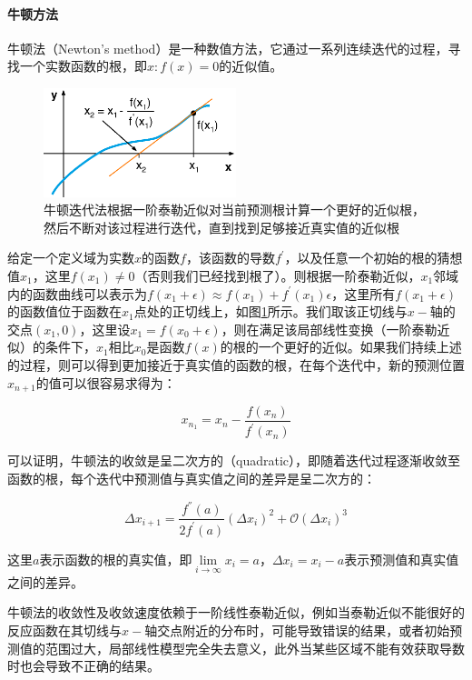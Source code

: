 \paragraph{牛顿方法}
牛顿法（Newton's method）是一种数值方法，它通过一系列连续迭代的过程，寻找一个实数函数的根，即$x:f(x)=0$的近似值。

\begin{figure}
	\sidecaption
	\includegraphics[width=0.5\textwidth]{figures/mlt/Newton-method}
	\caption{牛顿迭代法根据一阶泰勒近似对当前预测根计算一个更好的近似根，然后不断对该过程进行迭代，直到找到足够接近真实值的近似根}
	\label{f:mlt-Newton-method}
\end{figure}

给定一个定义域为实数$x$的函数$f$，该函数的导数$f^{'}$，以及任意一个初始的根的猜想值$x_1$，这里$f(x_1)\neq 0$（否则我们已经找到根了）。则根据一阶泰勒近似，$x_1$邻域内的函数曲线可以表示为$f(x_1+\epsilon)\approx f(x_1)+f^{'}(x_1)\epsilon$，这里所有$f(x_1+\epsilon)$的函数值位于函数在$x_1$点处的正切线上，如图\ref{f:mlt-Newton-method}所示。我们取该正切线与$x-$轴的交点$(x_1,0)$，这里设$x_1=f(x_0+\epsilon)$，则在满足该局部线性变换（一阶泰勒近似）的条件下，$x_1$相比$x_0$是函数$f(x)$的根的一个更好的近似。如果我们持续上述的过程，则可以得到更加接近于真实值的函数的根，在每个迭代中，新的预测位置$x_{n+1}$的值可以很容易求得为：

\begin{equation}
	x_{n_1}=x_n-\frac{f(x_n)}{f^{'}(x_n)}
\end{equation}

可以证明，牛顿法的收敛是呈二次方的（quadratic），即随着迭代过程逐渐收敛至函数的根，每个迭代中预测值与真实值之间的差异是呈二次方的：

\begin{equation}
	\Delta x_{i+1}=\frac{f^{''}(a)}{2f^{'}(a)}(\Delta x_i)^{2}+\mathcal{O}(\Delta x_i)^{3}
\end{equation}

\noindent 这里$a$表示函数的根的真实值，即$\lim\limits_{i\to\infty}x_i=a$，$\Delta x_i=x_i-a$表示预测值和真实值之间的差异。

牛顿法的收敛性及收敛速度依赖于一阶线性泰勒近似，例如当泰勒近似不能很好的反应函数在其切线与$x-$轴交点附近的分布时，可能导致错误的结果，或者初始预测值的范围过大，局部线性模型完全失去意义，此外当某些区域不能有效获取导数时也会导致不正确的结果。




